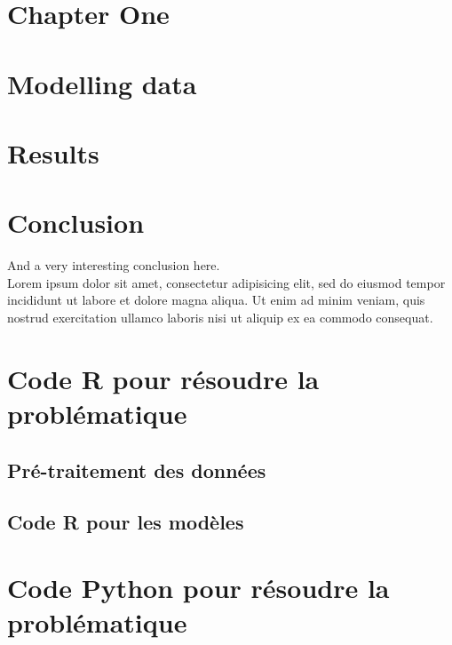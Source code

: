 \documentclass[a4paper, oneside, french, 12pt, final]{extreport}
\begin{document}


\chapter{Chapter One}%
\label{chap:chapterone}



\chapter{Modelling data}
\label{chap:2}


\chapter{Results}
\label{chap:3}
%
%



\chapter*{Conclusion}
\label{chap:conclusion}
%
  And a very interesting conclusion here\@. ~\\
  Lorem ipsum dolor sit amet, consectetur adipisicing elit, sed do eiusmod
  tempor incididunt ut labore et dolore magna aliqua. Ut enim ad minim veniam,
  quis nostrud exercitation ullamco laboris nisi ut aliquip ex ea commodo
  consequat.

\newpage
\appendix
{}

\chapter{Code R pour résoudre la problématique}
\label{chap:appendix}


\section{Pré-traitement des données}
\section{Code R pour les modèles}

\chapter{Code Python pour résoudre la problématique}
\label{chap:appendixB}
\end{document}
